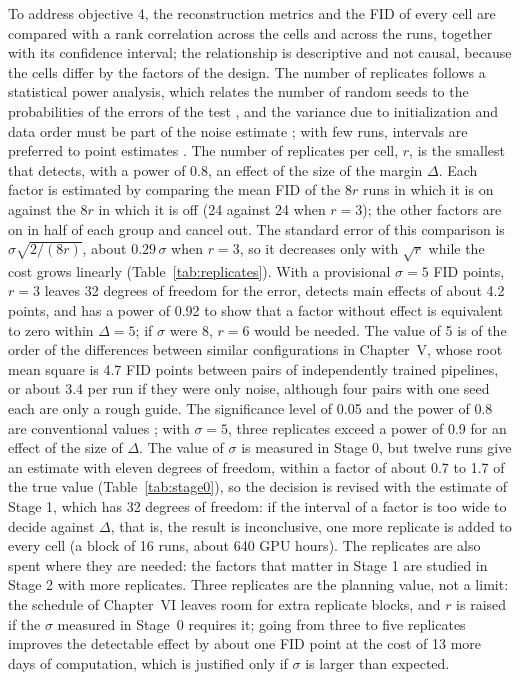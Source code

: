 To address objective 4, the reconstruction metrics and the FID of every cell are compared with a rank correlation across the cells and across the runs, together with its confidence interval; the relationship is descriptive and not causal, because the cells differ by the factors of the design. The number of replicates follows a statistical power analysis, which relates the number of random seeds to the probabilities of the errors of the test \cite{Colas2018}, and the variance due to initialization and data order must be part of the noise estimate \cite{Bouthillier2021}; with few runs, intervals are preferred to point estimates \cite{Agarwal2021}. The number of replicates per cell, $r$, is the smallest that detects, with a power of 0.8, an effect of the size of the margin $\Delta$. Each factor is estimated by comparing the mean FID of the $8r$ runs in which it is on against the $8r$ in which it is off (24 against 24 when $r=3$); the other factors are on in half of each group and cancel out. The standard error of this comparison is $\sigma\sqrt{2/(8r)}$, about $0.29\,\sigma$ when $r=3$, so it decreases only with $\sqrt{r}$ while the cost grows linearly (Table~\ref{tab:replicates}). With a provisional $\sigma=5$ FID points, $r=3$ leaves 32 degrees of freedom for the error, detects main effects of about 4.2 points, and has a power of 0.92 to show that a factor without effect is equivalent to zero within $\Delta=5$; if $\sigma$ were 8, $r=6$ would be needed. The value of 5 is of the order of the differences between similar configurations in Chapter~V, whose root mean square is 4.7 FID points between pairs of independently trained pipelines, or about 3.4 per run if they were only noise, although four pairs with one seed each are only a rough guide. The significance level of 0.05 and the power of 0.8 are conventional values \cite{Cohen1992}; with $\sigma=5$, three replicates exceed a power of 0.9 for an effect of the size of $\Delta$. The value of $\sigma$ is measured in Stage 0, but twelve runs give an estimate with eleven degrees of freedom, within a factor of about 0.7 to 1.7 of the true value (Table~\ref{tab:stage0}), so the decision is revised with the estimate of Stage 1, which has 32 degrees of freedom: if the interval of a factor is too wide to decide against $\Delta$, that is, the result is inconclusive, one more replicate is added to every cell (a block of 16 runs, about 640 GPU hours). The replicates are also spent where they are needed: the factors that matter in Stage 1 are studied in Stage 2 with more replicates. Three replicates are the planning value, not a limit: the schedule of Chapter~VI leaves room for extra replicate blocks, and $r$ is raised if the $\sigma$ measured in Stage~0 requires it; going from three to five replicates improves the detectable effect by about one FID point at the cost of 13 more days of computation, which is justified only if $\sigma$ is larger than expected.

